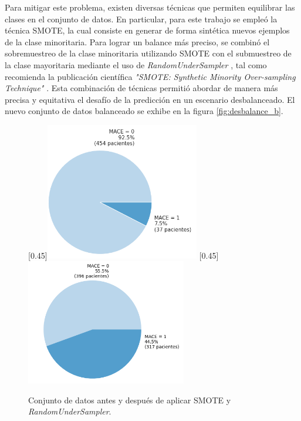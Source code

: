 Para mitigar este problema, existen diversas técnicas que permiten equilibrar las clases en el conjunto de datos. 
En particular, para este trabajo se empleó la técnica SMOTE, la cual consiste en generar de forma sintética nuevos 
ejemplos de la clase minoritaria. Para lograr un balance más preciso, se combinó el sobremuestreo de la clase 
minoritaria utilizando SMOTE con el submuestreo de la clase mayoritaria mediante el uso de \emph{RandomUnderSampler} \citep{CITE:50}, 
tal como recomienda la publicación científica \emph{"SMOTE: Synthetic Minority Over-sampling Technique"} \citep{CITE:37}.
Esta combinación de técnicas permitió abordar de manera más precisa y equitativa el desafío de la predicción en un escenario 
desbalanceado. El nuevo conjunto de datos balanceado se exhibe en la figura \ref{fig:desbalance_b}.


\begin{figure}[H]
	\centering
	\hspace{1em}
	[0.45\linewidth]{\includegraphics[height=6cm]{./Figures/desbalance_pie.png}}
	\hspace{1em}
	[0.45\linewidth]{\includegraphics[height=5.5cm]{./Figures/desbalance_smote_under_pie.png}}
	\caption{Conjunto de datos antes y después de aplicar SMOTE y \emph{RandomUnderSampler}.}
\end{figure}

